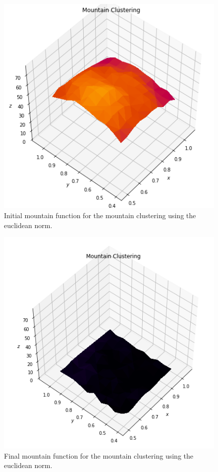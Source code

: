 \documentclass[conference]{IEEEtran}
\begin{document}
\begin{figure}[ht]
    \centering
    \includegraphics[scale = 0.45]{figures/iris/mountain-i.png}
    \caption{Initial mountain function for the mountain clustering using the euclidean norm.}
    \label{fig:mon-i-iris}
\end{figure}

\begin{figure}[ht]
    \centering
    \includegraphics[scale = 0.45]{figures/iris/mountain-f.png}
    \caption{Final mountain function for the mountain clustering using the euclidean norm.}
    \label{fig:mon-f-iris}
\end{figure}
\end{document}
